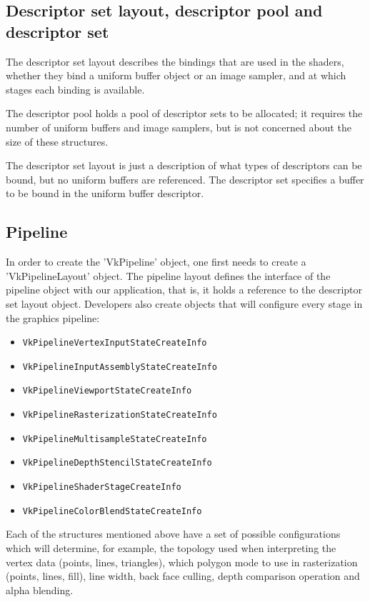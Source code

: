 \subsection{Descriptor set layout, descriptor pool and descriptor set}
The descriptor set layout describes the bindings that are used in the shaders, whether they bind a uniform buffer object or an image sampler, and at which stages each binding is available.

The descriptor pool holds a pool of descriptor sets to be allocated; it requires the number of uniform buffers and image samplers, but is not concerned about the size of these structures.

The descriptor set layout is just a description of what types of descriptors can be bound, but no uniform buffers are referenced. The descriptor set specifies a buffer to be bound in the uniform buffer descriptor.

\subsection{Pipeline}
In order to create the 'VkPipeline' object, one first needs to create a 'VkPipelineLayout' object. The pipeline layout defines the interface of the pipeline object with our application, that is, it holds a reference to the descriptor set layout object. Developers also create objects that will configure every stage in the graphics pipeline:

\begin{itemize}
    \item \texttt{VkPipelineVertexInputStateCreateInfo}
    \item \texttt{VkPipelineInputAssemblyStateCreateInfo}
    \item \texttt{VkPipelineViewportStateCreateInfo}
    \item \texttt{VkPipelineRasterizationStateCreateInfo}
    \item \texttt{VkPipelineMultisampleStateCreateInfo}
    \item \texttt{VkPipelineDepthStencilStateCreateInfo}
    \item \texttt{VkPipelineShaderStageCreateInfo}
    \item \texttt{VkPipelineColorBlendStateCreateInfo}
\end{itemize}

Each of the structures mentioned above have a set of possible configurations which will determine, for example, the topology used when interpreting the vertex data (points, lines, triangles), which polygon mode to use in rasterization (points, lines, fill), line width, back face culling, depth comparison operation and alpha blending.
